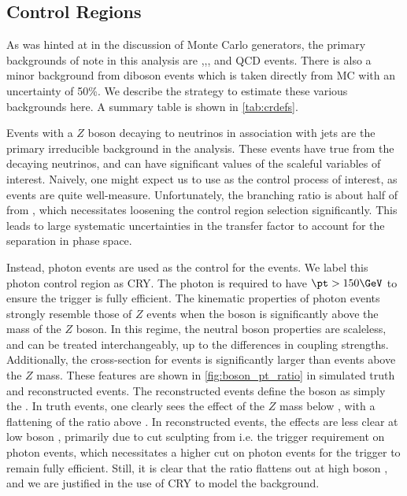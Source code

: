 \subsection{Control Regions}

As was hinted at in the discussion of Monte Carlo generators, the primary backgrounds of note in this analysis are \zjets,\wjets,\ttbar, and QCD events.
There is also a minor background from diboson events which is taken directly from MC with an uncertainty of 50\%.
We describe the strategy to estimate these various backgrounds here.
A summary table is shown in \ref{tab:crdefs}.


Events with a $Z$ boson decaying to neutrinos in association with jets are the primary irreducible background in the analysis.
These events have true \met from the decaying neutrinos, and can have significant values of the scaleful variables of interest.
Naively, one might expect us to use \Zll as the control process of interest, as \Zll events are quite well-measure.
Unfortunately, the \Zll branching ratio is about half of from \Zvv, which necessitates loosening the control region selection significantly.
This leads to large systematic uncertainties in the transfer factor to account for the separation in phase space.

Instead, photon events are used as the control for the \Zvv events.
We label this photon control region as CRY.
The photon is required to have $\pt > 150 \GeV$ to ensure the trigger is fully efficient.
The kinematic properties of photon events strongly resemble those of $Z$ events when the boson \pt is significantly above the mass of the $Z$ boson.
In this regime, the neutral boson properties are scaleless, and can be treated interchangeably, up to the differences in coupling strengths.
Additionally, the cross-section for \gammajets events is significantly larger than \zjets events above the $Z$ mass.
These features are shown in \ref{fig:boson_pt_ratio} in simulated \Zvv truth and reconstructed events.
The reconstructed \Zvv events define the boson \pt as simply the \met.
In truth events, one clearly sees the effect of the $Z$ mass below  \GeV, with a flattening of the ratio above  \GeV.
In reconstructed events, the effects are less clear at low boson \pt, primarily due to cut sculpting from i.e. the trigger requirement on photon events, which necessitates a higher \pt cut on photon events for the trigger to remain fully efficient.
Still, it is clear that the ratio flattens out at high boson \pt, and we are justified in the use of CRY to model the \zjets background.

